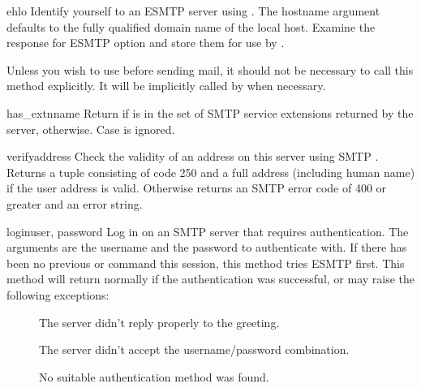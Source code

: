 \begin{methoddesc}{ehlo}{}
Identify yourself to an ESMTP server using .  The hostname
argument defaults to the fully qualified domain name of the local
host.  Examine the response for ESMTP option and store them for use by
.

Unless you wish to use  before sending
mail, it should not be necessary to call this method explicitly.  It
will be implicitly called by  when necessary.
\end{methoddesc}

\begin{methoddesc}{has_extn}{name}
Return  if  is in the set of SMTP service
extensions returned by the server,  otherwise.
Case is ignored.
\end{methoddesc}

\begin{methoddesc}{verify}{address}
Check the validity of an address on this server using SMTP .
Returns a tuple consisting of code 250 and a full  address
(including human name) if the user address is valid. Otherwise returns
an SMTP error code of 400 or greater and an error string.

\end{methoddesc}

\begin{methoddesc}{login}{user, password}
Log in on an SMTP server that requires authentication.
The arguments are the username and the password to authenticate with.
If there has been no previous  or  command this
session, this method tries ESMTP  first.
This method will return normally if the authentication was successful,
or may raise the following exceptions:

\begin{description}
  \item[]
    The server didn't reply properly to the  greeting.
  \item[]
    The server didn't accept the username/password combination.
  \item[]
    No suitable authentication method was found.
\end{description}
\end{methoddesc}

